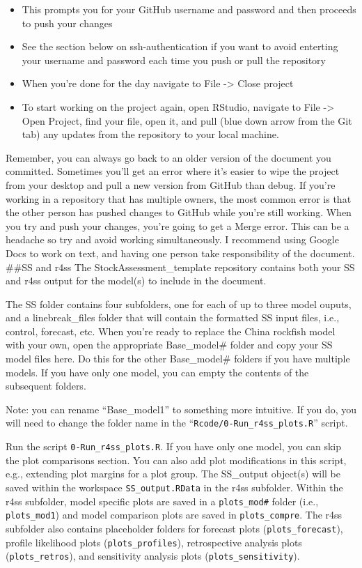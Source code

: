 \documentclass[12pt,]{article}
\providecommand{\tightlist}{%
  \setlength{\itemsep}{0pt}\setlength{\parskip}{0pt}}
\begin{document}
\begin{enumerate}
  \begin{itemize}
  \tightlist
  \item
    This prompts you for your GitHub username and password and then
    proceeds to push your changes
  \item
    See the section below on ssh-authentication if you want to avoid
    enterting your username and password each time you push or pull the
    repository
  \item
    When you're done for the day navigate to File -\textgreater{} Close
    project
  \item
    To start working on the project again, open RStudio, navigate to
    File -\textgreater{} Open Project, find your file, open it, and pull
    (blue down arrow from the Git tab) any updates from the repository
    to your local machine.
  \end{itemize}
\end{enumerate}

Remember, you can always go back to an older version of the document you
committed. Sometimes you'll get an error where it's easier to wipe the
project from your desktop and pull a new version from GitHub than debug.
If you're working in a repository that has multiple owners, the most
common error is that the other person has pushed changes to GitHub while
you're still working. When you try and push your changes, you're going
to get a Merge error. This can be a headache so try and avoid working
simultaneously. I recommend using Google Docs to work on text, and
having one person take responsibility of the document. \#\#SS and r4ss
The StockAssessment\_template repository contains both your SS and r4ss
output for the model(s) to include in the document.

The SS folder contains four subfolders, one for each of up to three
model ouputs, and a linebreak\_files folder that will contain the
formatted SS input files, i.e., control, forecast, etc. When you're
ready to replace the China rockfish model with your own, open the
appropriate Base\_model\# folder and copy your SS model files here. Do
this for the other Base\_model\# folders if you have multiple models. If
you have only one model, you can empty the contents of the subsequent
folders.

Note: you can rename ``Base\_model1'' to something more intuitive. If
you do, you will need to change the folder name in the
``\texttt{Rcode/0-Run\_r4ss\_plots.R}'' script.

Run the script \texttt{0-Run\_r4ss\_plots.R}. If you have only one
model, you can skip the plot comparisons section. You can also add plot
modifications in this script, e.g., extending plot margins for a plot
group. The SS\_output object(s) will be saved within the workspace
\texttt{SS\_output.RData} in the r4ss subfolder. Within the r4ss
subfolder, model specific plots are saved in a \texttt{plots\_mod\#}
folder (i.e., \texttt{plots\_mod1}) and model comparison plots are saved
in \texttt{plots\_compre}. The r4ss subfolder also contains placeholder
folders for forecast plots (\texttt{plots\_forecast}), profile
likelihood plots (\texttt{plots\_profiles}), retrospective analysis
plots (\texttt{plots\_retros}), and sensitivity analysis plots
(\texttt{plots\_sensitivity}).
\end{document}

